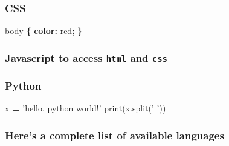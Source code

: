 \documentclass[10,portrait]{article}
\newenvironment{Shaded}{\begin{snugshade}}{\end{snugshade}}
\newcommand{\KeywordTok}[1]{\textcolor[rgb]{0.13,0.29,0.53}{\textbf{#1}}}
\newcommand{\DataTypeTok}[1]{\textcolor[rgb]{0.13,0.29,0.53}{#1}}
\newcommand{\StringTok}[1]{\textcolor[rgb]{0.31,0.60,0.02}{#1}}
\newcommand{\OperatorTok}[1]{\textcolor[rgb]{0.81,0.36,0.00}{\textbf{#1}}}
\newcommand{\BuiltInTok}[1]{#1}
\newcommand{\AttributeTok}[1]{\textcolor[rgb]{0.77,0.63,0.00}{#1}}
\newcommand{\NormalTok}[1]{#1}
\begin{document}
\subsubsection{CSS}\label{css}

\begin{Shaded}
\begin{Highlighting}[]
\NormalTok{body }\KeywordTok{\{}
  \KeywordTok{color:} \DataTypeTok{red}\KeywordTok{;}
\KeywordTok{\}}
\end{Highlighting}
\end{Shaded}

\subsubsection{\texorpdfstring{Javascript to access \texttt{html} and
\texttt{css}}{Javascript to access html and css}}\label{javascript-to-access-html-and-css}

\begin{Shaded}
\end{Shaded}

\subsubsection{Python}\label{python}

\begin{Shaded}
\begin{Highlighting}[]
\NormalTok{x }\OperatorTok{=} \StringTok{'hello, python world!'}
\BuiltInTok{print}\NormalTok{(x.split(}\StringTok{' '}\NormalTok{))}
\end{Highlighting}
\end{Shaded}

\subsubsection{Here's a complete list of available
languages}\label{heres-a-complete-list-of-available-languages}

\begin{Shaded}
\end{Shaded}
\end{document}
